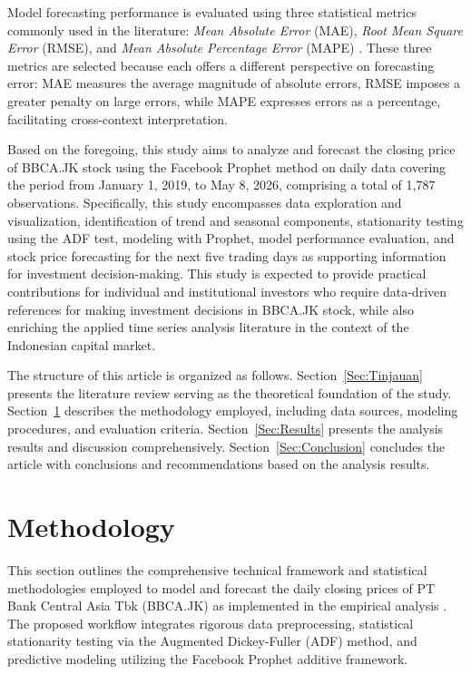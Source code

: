 \documentclass[11pt,twoside]{article}
\begin{document}
Model forecasting performance is evaluated using three statistical metrics commonly used in the literature: \textit{Mean Absolute Error} (MAE), \textit{Root Mean Square Error} (RMSE), and \textit{Mean Absolute Percentage Error} (MAPE) \cite{Hyndman2006}. These three metrics are selected because each offers a different perspective on forecasting error: MAE measures the average magnitude of absolute errors, RMSE imposes a greater penalty on large errors, while MAPE expresses errors as a percentage, facilitating cross-context interpretation.

Based on the foregoing, this study aims to analyze and forecast the closing price of BBCA.JK stock using the Facebook Prophet method on daily data covering the period from January 1, 2019, to May 8, 2026, comprising a total of 1,787 observations. Specifically, this study encompasses data exploration and visualization, identification of trend and seasonal components, stationarity testing using the ADF test, modeling with Prophet, model performance evaluation, and stock price forecasting for the next five trading days as supporting information for investment decision-making. This study is expected to provide practical contributions for individual and institutional investors who require data-driven references for making investment decisions in BBCA.JK stock, while also enriching the applied time series analysis literature in the context of the Indonesian capital market.

The structure of this article is organized as follows. Section~\ref{Sec:Tinjauan} presents the literature review serving as the theoretical foundation of the study. Section~\ref{Sec:Method} describes the methodology employed, including data sources, modeling procedures, and evaluation criteria. Section~\ref{Sec:Results} presents the analysis results and discussion comprehensively. Section~\ref{Sec:Conclusion} concludes the article with conclusions and recommendations based on the analysis results.
\section{Methodology}
\label{Sec:Method}

This section outlines the comprehensive technical framework and statistical methodologies employed to model and forecast the daily closing prices of PT Bank Central Asia Tbk (BBCA.JK) as implemented in the empirical analysis \cite{Taylor2018}. The proposed workflow integrates rigorous data preprocessing, statistical stationarity testing via the Augmented Dickey-Fuller (ADF) method, and predictive modeling utilizing the Facebook Prophet additive framework.
\end{document}
